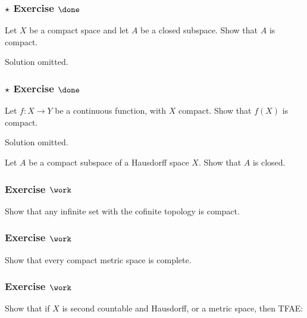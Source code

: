 \hypertarget{star-exercise-done}{%
\subsubsection{\texorpdfstring{\(\star\) Exercise
\(\done\)}{\textbackslash star Exercise \textbackslash done}}\label{star-exercise-done}}

Let \(X\) be a compact space and let \(A\) be a closed subspace. Show
that \(A\) is compact.

Solution omitted.

\hypertarget{star-exercise-done-1}{%
\subsubsection{\texorpdfstring{\(\star\) Exercise
\(\done\)}{\textbackslash star Exercise \textbackslash done}}\label{star-exercise-done-1}}

Let \(f : X \to Y\) be a continuous function, with \(X\) compact. Show
that \(f(X)\) is compact.

Solution omitted.

Let \(A\) be a compact subspace of a Hausdorff space \(X\). Show that
\(A\) is closed.

\hypertarget{exercise-work-11}{%
\subsubsection{\texorpdfstring{Exercise
\(\work\)}{Exercise \textbackslash work}}\label{exercise-work-11}}

Show that any infinite set with the cofinite topology is compact.

\hypertarget{exercise-work-12}{%
\subsubsection{\texorpdfstring{Exercise
\(\work\)}{Exercise \textbackslash work}}\label{exercise-work-12}}

Show that every compact metric space is complete.

\hypertarget{exercise-work-13}{%
\subsubsection{\texorpdfstring{Exercise
\(\work\)}{Exercise \textbackslash work}}\label{exercise-work-13}}

Show that if \(X\) is second countable and Hausdorff, or a metric space,
then TFAE:

